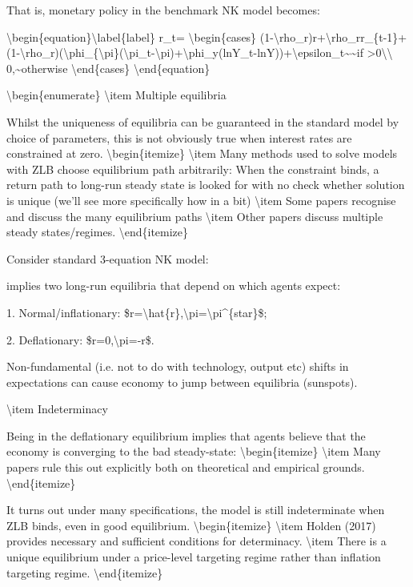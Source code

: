\documentclass[10pt,math=newtx,citestyle=gb7714-2015,bibstyle=gb7714-2015]{elegantbook}
\begin{document}
	That is, monetary policy in the benchmark NK model becomes:
	
	\textbackslash{}begin\{equation\}\textbackslash{}label\{label\}
	r\_t=
	\textbackslash{}begin\{cases\}
	(1-\textbackslash{}rho\_r)r+\textbackslash{}rho\_rr\_\{t-1\}+(1-\textbackslash{}rho\_r)(\textbackslash{}phi\_\{\textbackslash{}pi\}(\textbackslash{}pi\_t-\textbackslash{}pi)+\textbackslash{}phi\_y(lnY\_t-lnY))+\textbackslash{}epsilon\_t\~{}\~{}if >0\textbackslash{}\textbackslash{}
	0,\~{}otherwise
	\textbackslash{}end\{cases\}
	\textbackslash{}end\{equation\}
	
	\textbackslash{}begin\{enumerate\}
	\textbackslash{}item Multiple equilibria
	
	Whilst the uniqueness of equilibria can be guaranteed in the standard model by choice of parameters, this is not obviously true when interest rates are constrained at zero.
	\textbackslash{}begin\{itemize\}
	\textbackslash{}item Many methods used to solve models with ZLB choose equilibrium path arbitrarily: When the constraint binds, a return path to long-run steady state is looked for with no check whether solution is unique (we'll see more specifically how in a bit)
	\textbackslash{}item Some papers recognise and discuss the many equilibrium paths
	\textbackslash{}item Other papers discuss multiple steady states/regimes.
	\textbackslash{}end\{itemize\}
	
	Consider standard 3-equation NK model:
	
	implies two long-run equilibria that depend on which agents expect:
	
	1. Normal/inflationary: \$r=\textbackslash{}hat\{r\},\textbackslash{}pi=\textbackslash{}pi\^{}\{star\}\$;
	
	2. Deflationary: \$r=0,\textbackslash{}pi=-r\$.
	
	Non-fundamental (i.e. not to do with technology, output etc) shifts in expectations can cause economy to jump between equilibria (sunspots).
	
	\textbackslash{}item Indeterminacy
	
	Being in the deflationary equilibrium implies that agents believe that the economy is converging to the bad steady-state:
	\textbackslash{}begin\{itemize\}
	\textbackslash{}item Many papers rule this out explicitly both on theoretical and empirical grounds.
	\textbackslash{}end\{itemize\}
	
	It turns out under many specifications, the model is still indeterminate when ZLB binds, even in good equilibrium.
	\textbackslash{}begin\{itemize\}
	\textbackslash{}item Holden (2017) provides necessary and sufficient conditions for determinacy.
	\textbackslash{}item There is a unique equilibrium under a price-level targeting regime rather than inflation targeting regime.
	\textbackslash{}end\{itemize\}
	
\end{document}
